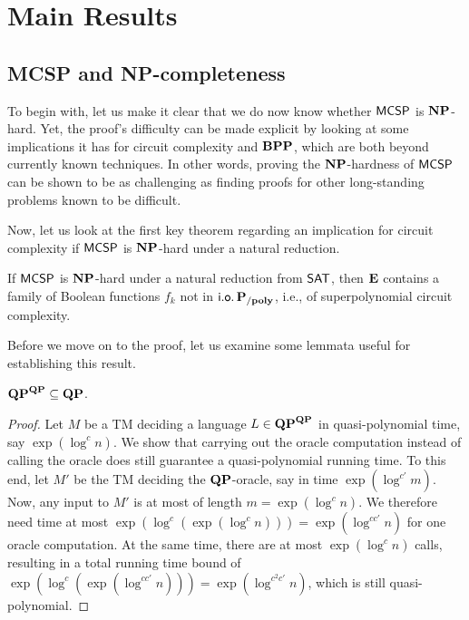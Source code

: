 \documentclass[11pt]{article}
\begin{document}


\section{Main Results}

\subsection{MCSP and NP-completeness}
\label{subsect:MCSP-NP}

To begin with, let us make it clear that we do now know whether
$\mathsf{MCSP}$ is $\mathbf{NP}$-hard.
Yet, the proof's difficulty can be made explicit by looking at
some implications it has for circuit complexity and $\mathbf{BPP}$, which are both
beyond currently known techniques.
%
In other words, proving the $\mathbf{NP}$-hardness of $\mathsf{MCSP}$ can be shown
to be as challenging as finding proofs for other long-standing
problems known to be difficult.

Now, let us look at the first key theorem regarding an
implication for circuit complexity if $\mathsf{MCSP}$ is $\mathbf{NP}$-hard
under a natural reduction.

\begin{theorem}[\cite{10.1145/335305.335314}]
  \label{thm:15-1}
  If $\mathsf{MCSP}$ is $\mathbf{NP}$-hard under a natural reduction from
  $\mathsf{SAT}$, then $\mathbf{E}$ contains a family of Boolean functions
  $f_k$ not in $\mathsf{i.o.}\, \mathbf{P_{/poly}}$, i.e., of superpolynomial circuit complexity.
\end{theorem}

Before we move on to the proof, let us examine some lemmata useful
for establishing this result.

\begin{lemma}
	\label{lem:qp-collapse}
	$\mathbf{QP}^{\mathbf{QP}} \subseteq \mathbf{QP}$.
\end{lemma}

\begin{proof}
  Let $M$ be a TM deciding a language $L \in \mathbf{QP}^{\mathbf{QP}}$ in
  quasi-polynomial time, say $\exp(\log^c n)$.
  We show that carrying out the oracle computation instead of calling the
  oracle does still guarantee a quasi-polynomial running time. To this end,
  let $M'$ be the TM deciding the $\mathbf{QP}$-oracle, say in time
  $\exp(\log^{c'} m)$.
  Now, any input to $M'$ is at most of length $m = \exp(\log^c n)$. We
  therefore need time at most
  $\exp(\log^c (\exp(\log^c n))) = \exp(\log^{cc'} n)$
  for one oracle computation. At the same time, there are at most
  $\exp(\log^c n)$ calls, resulting in a total running time bound of
  $\exp(\log^c (\exp(\log^{cc'} n))) = \exp(\log^{c^2 c'} n)$,
  which is still quasi-polynomial.
\end{proof}
\end{document}
